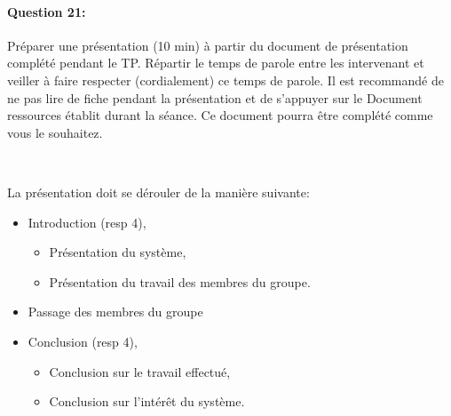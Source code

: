 
\paragraph{Question 21:} Préparer une présentation (10 min) à partir du document de présentation complété pendant le TP. Répartir le temps de parole entre les intervenant et veiller à faire respecter (cordialement) ce temps de parole. Il est recommandé de ne pas lire de fiche pendant la présentation et de s'appuyer sur le \og Document ressources \fg établit durant la séance. Ce document pourra être complété comme vous le souhaitez.

~\

La présentation doit se dérouler de la manière suivante:
\begin{itemize}
 \item Introduction (resp 4),
 \begin{itemize}
 \item Présentation du système,
 \item Présentation du travail des membres du groupe.
 \end{itemize}
 \item Passage des membres du groupe
 \item Conclusion (resp 4),
 \begin{itemize}
 \item Conclusion sur le travail effectué,
 \item Conclusion sur l'intérêt du système.
 \end{itemize}
\end{itemize}




